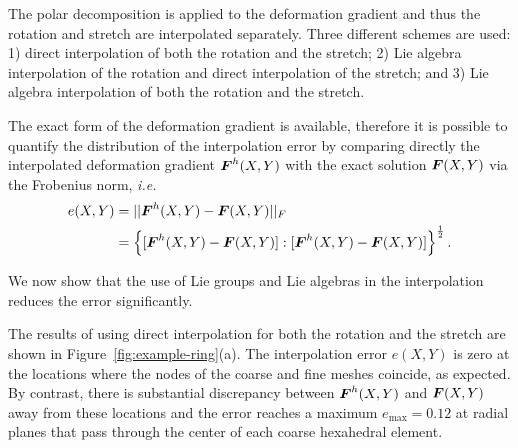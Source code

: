 \documentclass[12pt]{article}
\begin{document}
The polar decomposition is applied to the deformation gradient and thus
the rotation and stretch are interpolated separately. Three different
schemes are used: 1) direct interpolation of both the rotation and the
stretch; 2) Lie algebra interpolation of the rotation and direct
interpolation of the stretch; and 3) Lie algebra interpolation of both
the rotation and the stretch.

The exact form of the deformation gradient is available, therefore it
is possible to quantify the distribution of the interpolation error by
comparing directly the interpolated deformation gradient
${\boldsymbol{F}}^{h}(X,Y)$ with the exact solution ${\boldsymbol{F}}(X,Y)$ via the Frobenius
norm, \emph{i.e.}
\begin{align}
  e(X,Y) & =
  ||{\boldsymbol{F}}^{h}(X,Y) - {\boldsymbol{F}}(X,Y)||_{F} \nonumber
  \\
  & =
  \left\{
    [{\boldsymbol{F}}^{h}(X,Y) - {\boldsymbol{F}}(X,Y)] : [{\boldsymbol{F}}^{h}(X,Y)- {\boldsymbol{F}}(X,Y)]
  \right\}^{\frac{1}{2}}.
  \label{eq:Frobenius-norm-distribution}
\end{align} 

We now show that the use of Lie groups and Lie algebras in the
interpolation reduces the error significantly.

The results of using direct interpolation for both the rotation and the stretch
are shown in Figure~\ref{fig:example-ring}(a). The interpolation error $e(X,Y)$
is zero at the locations where the nodes of the coarse and fine meshes coincide,
as expected. By contrast, there is substantial discrepancy between
${\boldsymbol{F}}^{h}(X,Y)$ and ${\boldsymbol{F}}(X,Y)$ away from these locations and the error reaches a
maximum $e_{\text{max}} = 0.12$ at radial planes that pass through the center of
each coarse hexahedral element.
\end{document}

